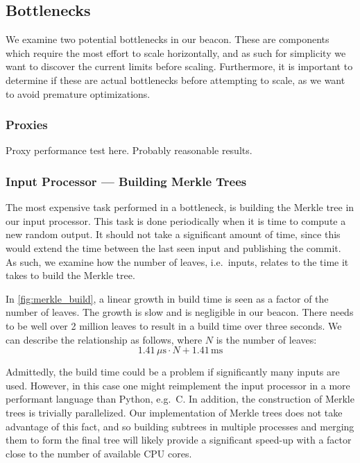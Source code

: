 \subsection{Bottlenecks}%
\label{sub:bottlenecks}

We examine two potential bottlenecks in our beacon.
These are components which require the most effort to scale horizontally, and as such for simplicity we want to discover the current limits before scaling.
Furthermore, it is important to determine if these are actual bottlenecks before attempting to scale, as we want to avoid premature optimizations.

\subsubsection{Proxies}%
\label{ssub:proxies}
Proxy performance test here.
Probably reasonable results.


\subsubsection{Input Processor --- Building Merkle Trees}%
\label{ssub:input_processor_building_merkle_trees}
The most expensive task performed in a bottleneck, is building the Merkle tree in our input processor.
This task is done periodically when it is time to compute a new random output.
It should not take a significant amount of time, since this would extend the time between the last seen input and publishing the commit.
As such, we examine how the number of leaves, i.e.\ inputs, relates to the time it takes to build the Merkle tree.

In \cref{fig:merkle_build}, a linear growth in build time is seen as a factor of the number of leaves.
The growth is slow and is negligible in our beacon. There needs to be well over 2 million leaves to result in a build time over three seconds.
We can describe the relationship as follows, where $N$ is the number of leaves:
$$
1.41\,\mu\text{s} \cdot N + 1.41\,\text{ms}
$$

Admittedly, the build time could be a problem if significantly many inputs are used.
However, in this case one might reimplement the input processor in a more performant language than Python, e.g.\ C.
In addition, the construction of Merkle trees is trivially parallelized.
Our implementation of Merkle trees does not take advantage of this fact, and so building subtrees in multiple processes and merging them to form the final tree will likely provide a significant speed-up with a factor close to the number of available CPU cores.

